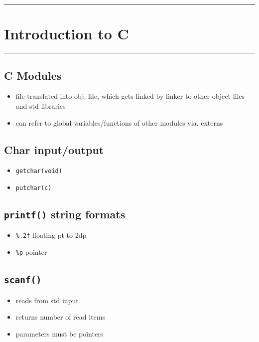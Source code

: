 \documentclass[10pt, multicolumn, a4paper]{article}
\begin{document}
\linespread{1} %
\small \normalsize %


\setcounter{section}{1} %
\hrule
\section{Introduction to C} 
\hrule

\begin{multicols}{2}
	\subsection*{C Modules}
	\begin{itemize}
	\item file translated into obj. file, which gets linked by linker to other object files and std libraries
	\item can refer to global variables/functions of other modules via. externs
	\end{itemize}
	\subsection*{Char input/output}
	\begin{itemize}
	\item \verb|getchar(void)|
	\item \verb|putchar(c)|
	\end{itemize}
	\subsection*{\texttt{printf()} string formats}
	\begin{itemize}
	\item \verb|%.2f| floating pt to 2dp
	\item \verb|%p| pointer
	\end{itemize}
	\subsection*{\texttt{scanf()}}
	\begin{itemize}
	\item reads from std input
	\item returns number of read items
	\item parameters must be pointers
	\end{itemize} 
\end{multicols}
\end{document}
